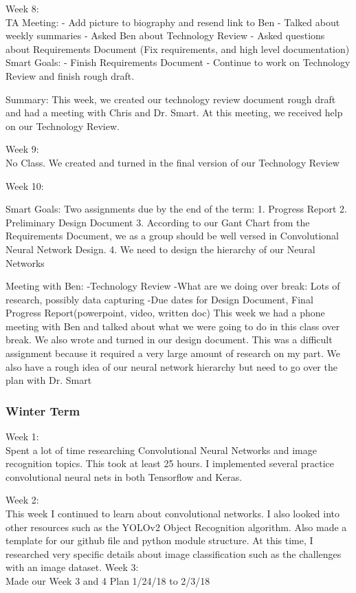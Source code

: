 \documentclass[draftclsnofoot, onecolumn, 10pt, compsoc]{IEEEtran}
\begin{document}
Week 8:
\\ \indent TA Meeting:
	- Add picture to biography and resend link to Ben
	- Talked about weekly summaries
	- Asked Ben about Technology Review
	- Asked questions about Requirements Document (Fix requirements, and high level documentation)
Smart Goals:
	- Finish Requirements Document
	- Continue to work on Technology Review and finish rough draft.
	
Summary:
	This week, we created our technology review document rough draft and had a meeting with Chris and Dr. Smart. At this meeting, we received help on our Technology Review.

Week 9:
\\ \indent No Class. We created and turned in the final version of our Technology Review

Week 10:

Smart Goals:
	Two assignments due by the end of the term: 
		1. Progress Report
		2. Preliminary Design Document
		3. According to our Gant Chart from the Requirements Document, we as a group should be well versed in Convolutional Neural Network Design.
		4. We need to design the hierarchy of our Neural Networks
		 

Meeting with Ben:
	-Technology Review
	-What are we doing over break: Lots of research, possibly data capturing
	-Due dates for Design Document, Final Progress Report(powerpoint, video, written doc)
This week we had a phone meeting with Ben and talked about what we were going to do in this class over break. We also wrote and turned in our design document. This was a difficult assignment because it required a very large amount of research on my part. We also have a rough idea of our neural network hierarchy but need to go over the plan with Dr. Smart





  \subsubsection{Winter Term}
  
Week 1:
\\ \indent Spent a lot of time researching Convolutional Neural Networks and image recognition topics. This took at least 25 hours. I implemented several practice convolutional neural nets in both Tensorflow and Keras.

Week 2:
\\ \indent This week I continued to learn about convolutional networks. I also looked into other resources such as the YOLOv2 Object Recognition algorithm. Also made a template for our github file and python module structure. At this time, I researched very specific details about image classification such as the challenges with an image dataset.
Week 3:
\\ \indent Made our Week 3 and 4 Plan 1/24/18 to 2/3/18
\end{document}
